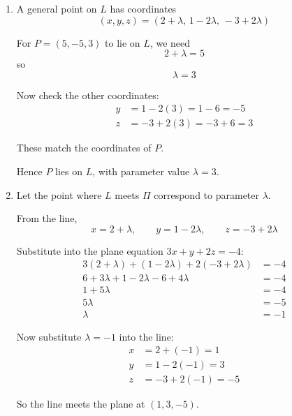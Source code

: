 \documentclass[leqno]{article}
\begin{document}
\begin{enumerate}[
  label=\textbf{\arabic*.},
  leftmargin=*,
  topsep=0pt,
  partopsep=0pt,
  parsep=0pt
]
\begin{tcolorbox}[colback=white, colframe=scarlet, title={\textbf{Solution}}, breakable, grow to left by=6mm, grow to right by=10mm]
\begin{enumerate}[label=\textbf{(\alph*)}]
Substituting into the formula:
\begin{align*}
\mathrm{dist}
&=\frac{\left\lvert 3(5)+1(-5)+2(3)-(-4)\right\rvert}{\sqrt{3^2+1^2+2^2}}\\
&=\frac{\left\lvert 15-5+6+4\right\rvert}{\sqrt{9+1+4}}\\
&=\frac{20}{\sqrt{14}}\\
&=\frac{10\sqrt{14}}{7}
\end{align*}

So the shortest distance from $P$ to $\Pi$ is $\displaystyle \frac{20}{\sqrt{14}}=\frac{10\sqrt{14}}{7}$.

  \item A general point on $L$ has coordinates
\[
(x,y,z)=(2+\lambda,\,1-2\lambda,\,-3+2\lambda)
\]

For $P=(5,-5,3)$ to lie on $L$, we need
\[
2+\lambda=5
\]
so
\[
\lambda=3
\]

Now check the other coordinates:
\begin{align*}
y&=1-2(3)=1-6=-5\\
z&=-3+2(3)=-3+6=3
\end{align*}

These match the coordinates of $P$.

Hence $P$ lies on $L$, with parameter value $\lambda=3$.

  \item Let the point where $L$ meets $\Pi$ correspond to parameter $\lambda$.

From the line,
\[
x=2+\lambda,\qquad y=1-2\lambda,\qquad z=-3+2\lambda
\]

Substitute into the plane equation $3x+y+2z=-4$:
\begin{align*}
3(2+\lambda)+(1-2\lambda)+2(-3+2\lambda)&=-4\\
6+3\lambda+1-2\lambda-6+4\lambda&=-4\\
1+5\lambda&=-4\\
5\lambda&=-5\\
\lambda&=-1
\end{align*}

Now substitute $\lambda=-1$ into the line:
\begin{align*}
x&=2+(-1)=1\\
y&=1-2(-1)=3\\
z&=-3+2(-1)=-5
\end{align*}

So the line meets the plane at $(1,3,-5)$.


\end{enumerate}
\end{tcolorbox}
\end{enumerate}
\end{document}
